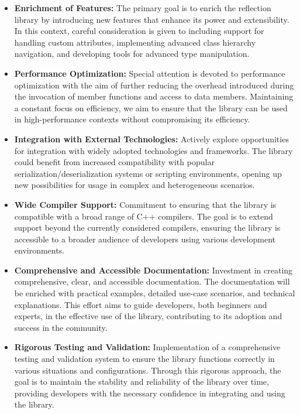 \documentclass[11pt]{article}
\begin{document}
\begin{multicols*}{2}[\columnsep=1cm]
    \begin{itemize}
        \item \textbf{Enrichment of Features:} The primary goal is to enrich the reflection library by introducing new features that enhance its power and extensibility. In this context, careful consideration is given to including support for handling custom attributes, implementing advanced class hierarchy navigation, and developing tools for advanced type manipulation.
        \item \textbf{Performance Optimization:} Special attention is devoted to performance optimization with the aim of further reducing the overhead introduced during the invocation of member functions and access to data members. Maintaining a constant focus on efficiency, we aim to ensure that the library can be used in high-performance contexts without compromising its efficiency.
        \item \textbf{Integration with External Technologies:} Actively explore opportunities for integration with widely adopted technologies and frameworks. The library could benefit from increased compatibility with popular serialization/deserialization systems or scripting environments, opening up new possibilities for usage in complex and heterogeneous scenarios.
        \item \textbf{Wide Compiler Support:} Commitment to ensuring that the library is compatible with a broad range of C++ compilers. The goal is to extend support beyond the currently considered compilers, ensuring the library is accessible to a broader audience of developers using various development environments.
        \item \textbf{Comprehensive and Accessible Documentation:} Investment in creating comprehensive, clear, and accessible documentation. The documentation will be enriched with practical examples, detailed use-case scenarios, and technical explanations. This effort aims to guide developers, both beginners and experts, in the effective use of the library, contributing to its adoption and success in the community.
        \item \textbf{Rigorous Testing and Validation:} Implementation of a comprehensive testing and validation system to ensure the library functions correctly in various situations and configurations. Through this rigorous approach, the goal is to maintain the stability and reliability of the library over time, providing developers with the necessary confidence in integrating and using the library.
    \end{itemize}


\end{multicols*}
\end{document}
